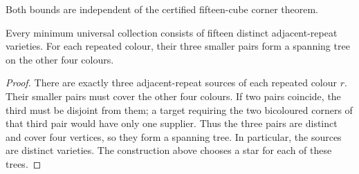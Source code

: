 Both bounds are independent of the certified fifteen-cube corner theorem.


\begin{samepage}
\begin{corollary}\label{cor:universal-structure}
Every minimum universal collection consists of fifteen distinct adjacent-repeat
varieties. For each repeated colour, their three smaller pairs form a spanning
tree on the other four colours.
\end{corollary}
\begin{proof}
There are exactly three adjacent-repeat sources of each repeated colour $r$.
Their smaller pairs must cover the other four colours. If two pairs coincide,
the third must be disjoint from them; a target requiring the two bicoloured
corners of that third pair would have only one supplier. Thus the three pairs
are distinct and cover four vertices, so they form a spanning tree. In
particular, the sources are distinct varieties. The construction above chooses
a star for each of these trees.
\end{proof}
\end{samepage}
